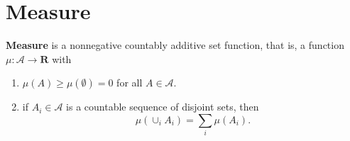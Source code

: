 \section{Measure}

\begin{definition}[Measure]
	\textbf{Measure} is a nonnegative countably additive set function, that is, a function $\mu:\mathcal{A}\rightarrow\mathbf{R}$ with
	\begin{enumerate}
		\item $\mu(A)\geq\mu(\emptyset)=0$ for all $A\in\mathcal{A}$.
		\item if $A_i\in\mathcal{A}$ is a countable sequence of disjoint sets, then $$\mu(\cup_iA_i)=\sum_i\mu(A_i).$$
	\end{enumerate}
\end{definition}





